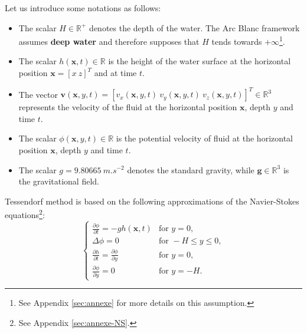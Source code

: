 \documentclass[final]{jcgt}
\def\Framework{The Arc Blanc framework\xspace}
\begin{document}
Let us introduce some notations as follows:
\begin{itemize}
	\item The scalar $H\in\mathbb R^+$ denotes the depth of the water. \Framework assumes \textbf{deep water} and therefore supposes that $H$ tends towards $+\infty$\footnote{See Appendix \ref{sec:annexe} for more details on this assumption.}.
	\item The scalar $h(\mathbf x, t)\in\mathbb R$ is the height of the water surface at the horizontal position $\mathbf x=\left[x~z\right]^T$ and at time $t$.
	\item The vector $\mathbf{v}(\mathbf x, y, t) =  \left[v_x(\mathbf x, y, t)\ v_y(\mathbf x, y, t)\ v_z(\mathbf x, y, t)\right]^T\in\mathbb R^3$ represents the velocity of the fluid at the horizontal position $\mathbf x$, depth $y$ and time $t$.
	\item The scalar $\phi(\mathbf x,y,t)\in\mathbb R$ is the potential velocity of fluid at the horizontal position $\mathbf x$, depth $y$ and time $t$.
	\item The scalar $g=9.80665~m.s^{-2}$ denotes the standard gravity, while $\mathbf g\in\mathbb R^3$ is the gravitational field.
\end{itemize}

Tessendorf method is based on the following approximations of the Navier-Stokes equations\footnote{See Appendix  \ref{sec:annexe-NS}.}:
\begin{equation}
	\label{equa:systemTessendorf}
	\left\lbrace
	\begin{array}{ll}
		\frac{\partial\phi}{\partial t} = -gh(\mathbf x,t)            & \text{for }y=0,            \\
		\Delta\phi=0                                                  & \text{for }-H\leq y\leq 0, \\
		\frac{\partial h}{\partial t}=\frac{\partial\phi}{\partial y} & \text{for }y=0,            \\
		\frac{\partial\phi}{\partial y}=0                             & \text{for }y=-H.
	\end{array}
	\right.
\end{equation}

\end{document}
